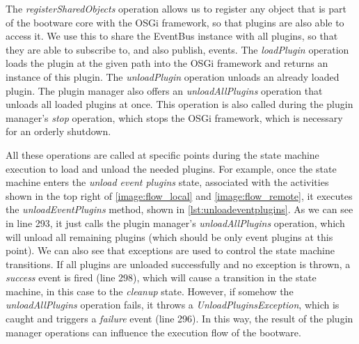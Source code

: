\vspace*{\baselineskip}

The \textit{registerSharedObjects} operation allows us to register any object that is part of the bootware core with the OSGi framework, so that plugins are also able to access it.
We use this to share the EventBus instance with all plugins, so that they are able to subscribe to, and also publish, events.
The \textit{loadPlugin} operation loads the plugin at the given path into the OSGi framework and returns an instance of this plugin.
The \textit{unloadPlugin} operation unloads an already loaded plugin.
The plugin manager also offers an \textit{unloadAllPlugins} operation that unloads all loaded plugins at once.
This operation is also called during the plugin manager's \textit{stop} operation, which stops the OSGi framework, which is necessary for an orderly shutdown.

All these operations are called at specific points during the state machine execution to load and unload the needed plugins.
For example, once the state machine enters the \textit{unload event plugins} state, associated with the activities shown in the top right of \autoref{image:flow_local} and \autoref{image:flow_remote}, it executes the \textit{unloadEventPlugins} method, shown in \autoref{lst:unloadeventplugins}.
As we can see in line 293, it just calls the plugin manager's \textit{unloadAllPlugins} operation, which will unload all remaining plugins (which should be only event plugins at this point).
We can also see that exceptions are used to control the state machine transitions.
If all plugins are unloaded successfully and no exception is thrown, a \textit{success} event is fired (line 298), which will cause a transition in the state machine, in this case to the \textit{cleanup} state.
However, if somehow the \textit{unloadAllPlugins} operation fails, it throws a \textit{UnloadPluginsException}, which is caught and triggers a \textit{failure} event (line 296).
In this way, the result of the plugin manager operations can influence the execution flow of the bootware.

\vspace*{\baselineskip}
